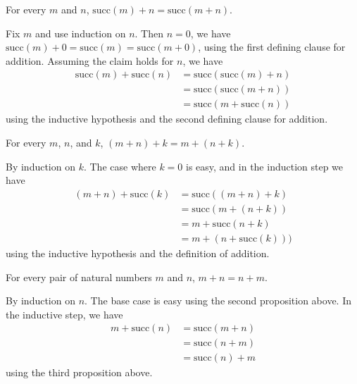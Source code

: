 \documentclass[letterpaper,10pt,english]{sphinxmanual}
\begin{document}
\sphinxAtStartPar
{} For every \(m\) and \(n\), \(\mathrm{succ}(m) + n = \mathrm{succ}(m + n)\).

\sphinxAtStartPar
{} Fix \(m\) and use induction on \(n\). Then \(n = 0\), we have \(\mathrm{succ}(m) + 0 = \mathrm{succ}(m) = \mathrm{succ}(m + 0)\), using the first defining clause for addition. Assuming the claim holds for \(n\), we have
\begin{equation*}
\begin{split}\mathrm{succ}(m) + \mathrm{succ}(n) & = \mathrm{succ}(\mathrm{succ}(m) + n) \\
& = \mathrm{succ} (\mathrm{succ} (m + n)) \\
& = \mathrm{succ} (m + \mathrm{succ}(n))\end{split}
\end{equation*}
\sphinxAtStartPar
using the inductive hypothesis and the second defining clause for addition.

\sphinxAtStartPar
{} For every \(m\), \(n\), and \(k\), \((m + n) + k = m + (n + k)\).

\sphinxAtStartPar
{} By induction on \(k\). The case where \(k = 0\) is easy, and in the induction step we have
\begin{equation*}
\begin{split}(m + n) + \mathrm{succ}(k) & = \mathrm{succ} ((m + n) + k) \\
& = \mathrm{succ} (m + (n + k)) \\
& = m + \mathrm{succ} (n + k) \\
& = m + (n + \mathrm{succ} (k)))\end{split}
\end{equation*}
\sphinxAtStartPar
using the inductive hypothesis and the definition of addition.

\sphinxAtStartPar
{} For every pair of natural numbers \(m\) and \(n\), \(m + n = n + m\).

\sphinxAtStartPar
{} By induction on \(n\). The base case is easy using the second proposition above. In the inductive step, we have
\begin{equation*}
\begin{split}m + \mathrm{succ}(n) & = \mathrm{succ}(m + n) \\
& = \mathrm{succ} (n + m) \\
& = \mathrm{succ}(n) + m\end{split}
\end{equation*}
\sphinxAtStartPar
using the third proposition above.
\end{document}
